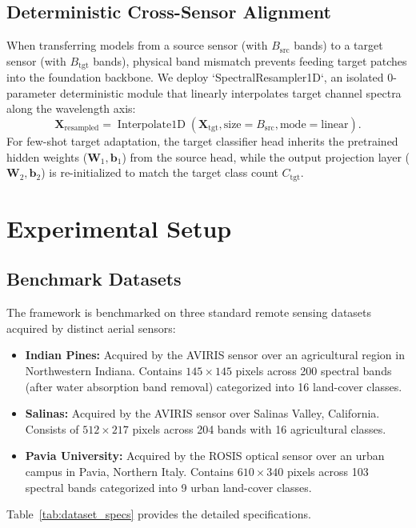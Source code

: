 \documentclass[conference,letterpaper]{IEEEtran}
\begin{document}
\subsection{Deterministic Cross-Sensor Alignment}
When transferring models from a source sensor (with $B_{\text{src}}$ bands) to a target sensor (with $B_{\text{tgt}}$ bands), physical band mismatch prevents feeding target patches into the foundation backbone. We deploy `SpectralResampler1D`, an isolated 0-parameter deterministic module that linearly interpolates target channel spectra along the wavelength axis:
\begin{equation}
\mathbf{X}_{\text{resampled}} = \operatorname{Interpolate1D}\left(\mathbf{X}_{\text{tgt}}, \text{size}=B_{\text{src}}, \text{mode}=\text{linear}\right).
\end{equation}
For few-shot target adaptation, the target classifier head inherits the pretrained hidden weights ($\mathbf{W}_1, \mathbf{b}_1$) from the source head, while the output projection layer ($\mathbf{W}_2, \mathbf{b}_2$) is re-initialized to match the target class count $C_{\text{tgt}}$.

\section{Experimental Setup}

\subsection{Benchmark Datasets}
The framework is benchmarked on three standard remote sensing datasets acquired by distinct aerial sensors:
\begin{itemize}
    \item \textbf{Indian Pines:} Acquired by the AVIRIS sensor over an agricultural region in Northwestern Indiana. Contains $145 \times 145$ pixels across 200 spectral bands (after water absorption band removal) categorized into 16 land-cover classes.
    \item \textbf{Salinas:} Acquired by the AVIRIS sensor over Salinas Valley, California. Consists of $512 \times 217$ pixels across 204 bands with 16 agricultural classes.
    \item \textbf{Pavia University:} Acquired by the ROSIS optical sensor over an urban campus in Pavia, Northern Italy. Contains $610 \times 340$ pixels across 103 spectral bands categorized into 9 urban land-cover classes.
\end{itemize}
Table~\ref{tab:dataset_specs} provides the detailed specifications.
\end{document}
